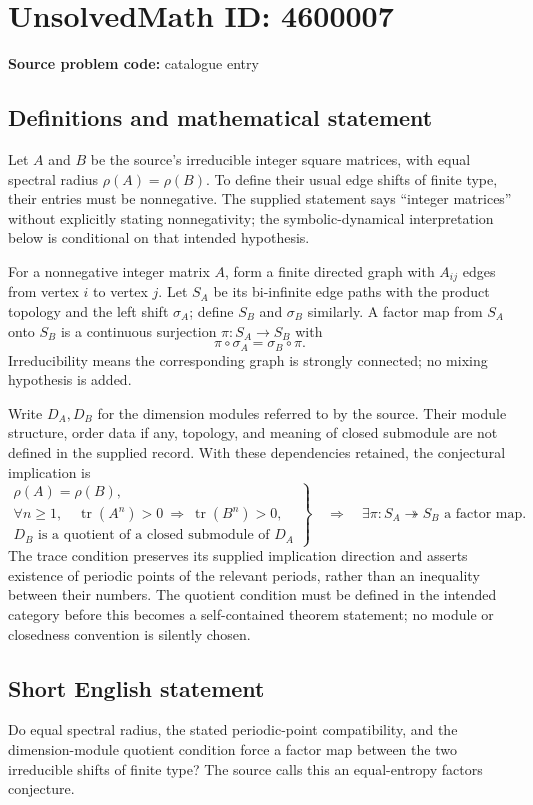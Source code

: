 \documentclass[11pt]{article}
\begin{document}
\section*{UnsolvedMath ID: 4600007}
\textbf{Source problem code:} catalogue entry
\subsection{Definitions and mathematical statement}
Let $A$ and $B$ be the source's irreducible integer square matrices, with equal spectral radius $\rho(A)=\rho(B)$. To define their usual edge shifts of finite type, their entries must be nonnegative. The supplied statement says ``integer matrices'' without explicitly stating nonnegativity; the symbolic-dynamical interpretation below is conditional on that intended hypothesis.

For a nonnegative integer matrix $A$, form a finite directed graph with $A_{ij}$ edges from vertex $i$ to vertex $j$. Let $S_A$ be its bi-infinite edge paths with the product topology and the left shift $\sigma_A$; define $S_B$ and $\sigma_B$ similarly. A factor map from $S_A$ onto $S_B$ is a continuous surjection $\pi:S_A\to S_B$ with
\[
 \pi\circ\sigma_A=\sigma_B\circ\pi.
\]
Irreducibility means the corresponding graph is strongly connected; no mixing hypothesis is added.

Write $D_A,D_B$ for the dimension modules referred to by the source. Their module structure, order data if any, topology, and meaning of closed submodule are not defined in the supplied record. With these dependencies retained, the conjectural implication is
\[
 \left.
 \begin{gathered}
 \rho(A)=\rho(B),\\
 \forall n\ge1,\quad\operatorname{tr}(A^n)>0
                 \ \Longrightarrow\ \operatorname{tr}(B^n)>0,\\
 D_B\text{ is a quotient of a closed submodule of }D_A
 \end{gathered}
 \right\}
 \quad\Longrightarrow\quad
 \exists\pi:S_A\twoheadrightarrow S_B\text{ a factor map}.
\]
The trace condition preserves its supplied implication direction and asserts existence of periodic points of the relevant periods, rather than an inequality between their numbers. The quotient condition must be defined in the intended category before this becomes a self-contained theorem statement; no module or closedness convention is silently chosen.
\subsection{Short English statement}
Do equal spectral radius, the stated periodic-point compatibility, and the dimension-module quotient condition force a factor map between the two irreducible shifts of finite type? The source calls this an equal-entropy factors conjecture.
\end{document}
